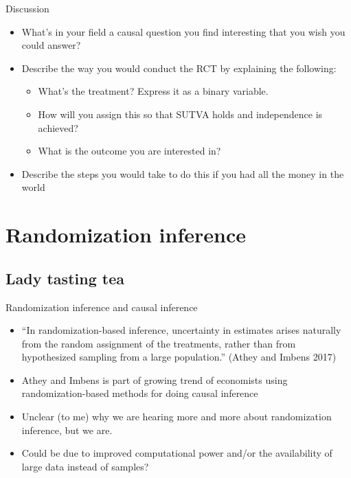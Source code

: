 \documentclass{beamer}
\begin{document}
\begin{frame}{Discussion}

  \begin{itemize}
    \item What's in your field a causal question you find interesting that you wish you could answer?
    \item Describe the way you would conduct the RCT by explaining the following:
          \begin{itemize}
            \item What's the treatment?  Express it as a binary variable.
            \item How will you assign this so that SUTVA holds and independence is achieved?
            \item What is the outcome you are interested in?
          \end{itemize}
    \item Describe the steps you would take to do this if you had all the money in the world
  \end{itemize}

\end{frame}

\section{Randomization inference}

\subsection{Lady tasting tea}

\begin{frame}{Randomization inference and causal inference}

\begin{itemize}
\item ``In randomization-based inference, uncertainty in estimates arises naturally from the random assignment of the treatments, rather than from hypothesized sampling from a large population.'' (Athey and Imbens 2017)

\item Athey and Imbens is part of growing trend of economists using randomization-based methods for doing causal inference

\item Unclear (to me) why we are hearing more and more about randomization inference, but we are. 

\item Could be due to improved computational power and/or the availability of large data instead of samples?

\end{itemize}


\end{frame}
\end{document}
